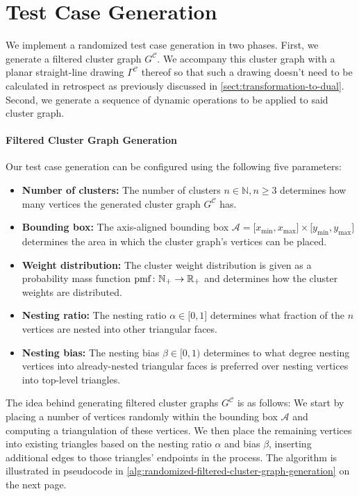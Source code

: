 \section{Test Case Generation}
\label{sect:test-case-generation}

We implement a randomized test case generation in two phases.
First, we generate a filtered cluster graph $G^\mathcal{C}$.
We accompany this cluster graph with a planar straight-line drawing $\Gamma^\mathcal{C}$ thereof so that such a drawing doesn't need to be calculated in retrospect as previously discussed in \cref{sect:transformation-to-dual}.
Second, we generate a sequence of dynamic operations to be applied to said cluster graph.

\paragraph{Filtered Cluster Graph Generation}

Our test case generation can be configured using the following five parameters:
%
\begin{itemize}
\item \textbf{Number of clusters:} The number of clusters $n \in \mathbb{N}, n \geq 3$ determines how many vertices the generated cluster graph $G^\mathcal{C}$ has.
\item \textbf{Bounding box:} The axis-aligned bounding box $\mathcal{A} = \lbrack x_\text{min}, x_\text{max} \rbrack \times \lbrack y_\text{min}, y_\text{max} \rbrack$ determines the area in which the cluster graph's vertices can be placed.
\item \textbf{Weight distribution:} The cluster weight distribution is given as a probability mass function $\operatorname{pmf} \colon \mathbb{N}_+ \to \mathbb{R}_+$ and determines how the cluster weights are distributed.
\item \textbf{Nesting ratio:} The nesting ratio $\alpha \in \lbrack 0, 1 \rbrack$ determines what fraction of the $n$ vertices are nested into other triangular faces.
\item \textbf{Nesting bias:} The nesting bias $\beta \in \lbrack 0, 1 )$ determines to what degree nesting vertices into already-nested triangular faces is preferred over nesting vertices into top-level triangles.
\end{itemize}

The idea behind generating filtered cluster graphs $G^\mathcal{C}$ is as follows:
We start by placing a number of vertices randomly within the bounding box $\mathcal{A}$ and computing a triangulation of these vertices.
We then place the remaining vertices into existing triangles based on the nesting ratio $\alpha$ and bias $\beta$, inserting additional edges to those triangles' endpoints in the process.
The algorithm is illustrated in pseudocode in \cref{alg:randomized-filtered-cluster-graph-generation} on the next page.

